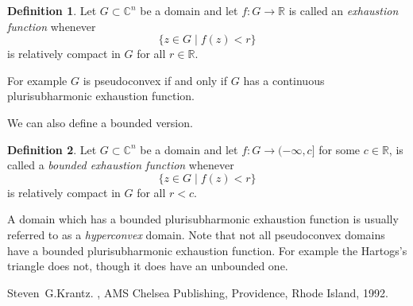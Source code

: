 \documentclass[12pt]{article}
\theoremstyle{theorem}
\theoremstyle{definition}
\newtheorem*{defn}{Definition}
\begin{document}
\begin{defn}
Let $G \subset {\mathbb{C}}^n$ be a domain and let $f \colon G \to
{\mathbb{R}}$ is called an {\em exhaustion function} whenever
\begin{equation*}
\{ z \in G \mid f(z) < r \}
\end{equation*}
is relatively compact in $G$ for all $r \in {\mathbb{R}}$.
\end{defn}

For example $G$ is pseudoconvex if and only if $G$ has a continuous
plurisubharmonic exhaustion function.

We can also define a bounded version.

\begin{defn}
Let $G \subset {\mathbb{C}}^n$ be a domain and let $f \colon G \to
(-\infty,c]$ for some $c \in {\mathbb{R}}$,
is called a {\em bounded exhaustion function} whenever
\begin{equation*}
\{ z \in G \mid f(z) < r \}
\end{equation*}
is relatively compact in $G$ for all $r < c$.
\end{defn}

A domain which has a bounded plurisubharmonic exhaustion function is usually
referred to as a {\em hyperconvex} domain.  Note that not all pseudoconvex
domains have a bounded plurisubharmonic exhaustion function.  For example
the Hartogs's triangle does not, though it does have an unbounded one.

\begin{thebibliography}{9}
Steven~G.\@ Krantz.
{\em {}},
AMS Chelsea Publishing, Providence, Rhode Island, 1992.
\end{thebibliography}
\end{document}
